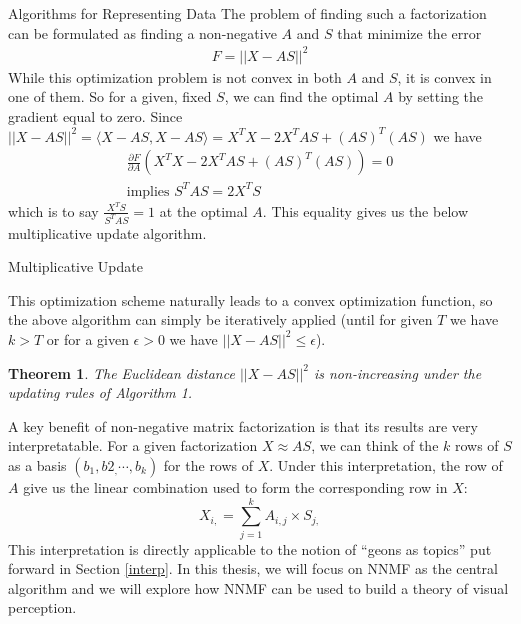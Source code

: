\documentclass[12pt]{pom_thesis}
\newtheorem{theorem}{Theorem}
\begin{document}
\begin{chapter}{Algorithms for Representing Data}
The problem of finding such a factorization can be formulated as finding a non-negative $A$ and $S$ that minimize the error 
\begin{align}F = ||X-AS||^2
\end{align}
While this optimization problem is not convex in both $A$ and $S$, it is convex in one of them. So for a given, fixed $S$, we can find the optimal $A$ by setting the gradient equal to zero. Since $||X-AS||^2 = \langle X-AS, X-AS \rangle= X^TX - 2X^TAS + (AS)^T(AS)$ we have
\begin{align*}
\frac{\partial F }{\partial A} ( X^TX - 2X^TAS + (AS)^T(AS)) = 0\\
\text{implies }S^TAS = 2X^TS
\end{align*}
which is to say $\frac{X^TS}{S^TAS}=1$ at the optimal $A$. This equality gives us the below multiplicative update algorithm. 

\begin{algorithm}[H]
	\caption{Multiplicative Update}
\end{algorithm}

This optimization scheme naturally leads to a convex optimization function, so the above algorithm can simply be iteratively applied (until for given $T$ we have $k>T$ or for a given $\epsilon>0$ we have $||X-AS||^2 \leq \epsilon$).
\begin{theorem}
	The Euclidean distance $||X-AS||^2$ is non-increasing under the updating rules of Algorithm 1.
\end{theorem}

A key benefit of non-negative matrix factorization is that its results are very interpretatable. For a given factorization $X \approx AS$, we can think of the $k$ rows of $S$ as a basis $(b_1,b2_,\cdots,b_k)$ for the rows of $X$. Under this interpretation, the row of $A$ give us the linear combination used to form the corresponding row in $X:$
$$X_{i,} = \sum_{j= 1}^k A_{i,j} \times S_{j,}$$
This interpretation is directly applicable to the notion of ``geons as topics'' put forward in Section \ref{interp}. In this thesis, we will focus on NNMF as the central algorithm and we will explore how NNMF can be used to build a theory of visual perception.


\end{chapter}
\end{document}
